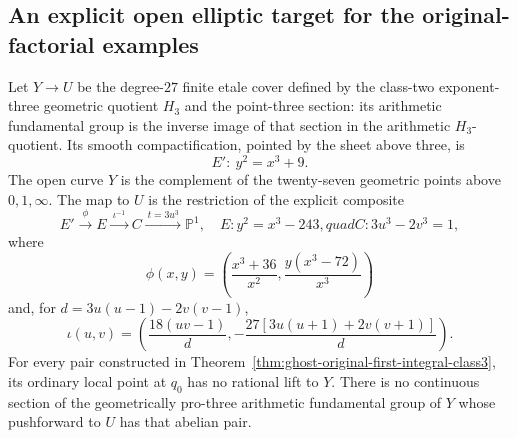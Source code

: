\subsection{An explicit open elliptic target for the original-factorial examples}
\label{sec:ghost-elliptic-target}

\begin{proposition}
\label{prop:ghost-elliptic-target}
Let \(Y\to U\) be the degree-\(27\) finite etale
cover defined by the class-two exponent-three geometric
quotient \(H_3\) and the point-three section: its
arithmetic fundamental group is the inverse image
of that section in the arithmetic \(H_3\)-quotient.
Its smooth compactification, pointed by the sheet
above three, is
\[
                 E':\ y^2=x^3+9.
\]
The open curve \(Y\) is the complement of the
twenty-seven geometric points above \(0,1,\infty\).
The map to \(U\) is the restriction of the explicit
composite
\[
 E'\xrightarrow{\ \phi\ } E
   \xrightarrow{\ \iota^{-1}\ } C
   \xrightarrow{\ t=3u^3\ }\mathbb P^1,
 \quad
 E:y^2=x^3-243,quad C:3u^3-2v^3=1,
                                                        \tag{8}
\]
where
\[
 \phi(x,y)=\left(\frac{x^3+36}{x^2},
                    \frac{y(x^3-72)}{x^3}\right)
\]
and, for \(d=3u(u-1)-2v(v-1)\),
\[
 \iota(u,v)=
 \left(\frac{18(uv-1)}d,
       -\frac{27[3u(u+1)+2v(v+1)]}d\right).
                                                        \tag{9}
\]
For every pair constructed in
Theorem~\ref{thm:ghost-original-first-integral-class3},
its ordinary local point at \(q_0\) has no rational
lift to \(Y\). There is no continuous section of the
geometrically pro-three arithmetic fundamental group
of \(Y\) whose pushforward to \(U\) has that
abelian pair.
\end{proposition}
